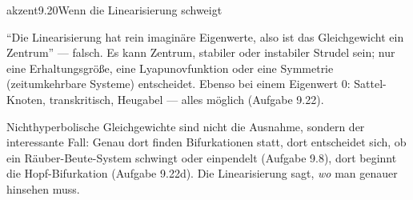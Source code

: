 \begin{loesungkarte}{akzent}{9.20}{Wenn die Linearisierung schweigt}
\begin{fehler}
\enquote{Die Linearisierung hat rein imaginäre Eigenwerte, also ist das Gleichgewicht ein Zentrum} --- falsch. Es kann Zentrum, stabiler oder instabiler Strudel sein; nur eine Erhaltungsgröße, eine Lyapunovfunktion oder eine Symmetrie (zeitumkehrbare Systeme) entscheidet. Ebenso bei einem Eigenwert $0$: Sattel-Knoten, transkritisch, Heugabel --- alles möglich (Aufgabe 9.22).
\end{fehler}
\begin{mitnehmen}\kastentext
Nichthyperbolische Gleichgewichte sind nicht die Ausnahme, sondern der interessante Fall: Genau dort finden Bifurkationen statt, dort entscheidet sich, ob ein Räuber-Beute-System schwingt oder einpendelt (Aufgabe 9.8), dort beginnt die Hopf-Bifurkation (Aufgabe 9.22d). Die Linearisierung sagt, \emph{wo} man genauer hinsehen muss.
\end{mitnehmen}
\end{loesungkarte}

